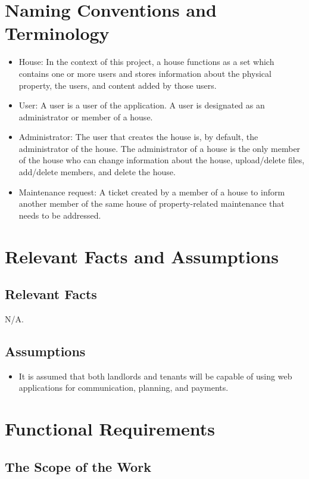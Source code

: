 \documentclass[12pt]{article}
\begin{document}
\section{Naming Conventions and Terminology}
    \begin{itemize}
    \item House: In the context of this project, a house functions as a set
      which contains one or more users and stores information about the
      physical property, the users, and content added by those users.
    \item User: A user is a user of the application. A user is designated as an administrator or member of a house.
    \item Administrator: The user that creates the house is, by default, the administrator of the house. The administrator of a house is the only member of the house who can change information about the house, upload/delete files, add/delete members, and delete the house.
    \item Maintenance request: A ticket created by a member of a house to inform another member of the same house of property-related maintenance that needs to be addressed.
    \end{itemize}

\section{Relevant Facts and Assumptions} 
\subsection{Relevant Facts}
N/A.
\subsection{Assumptions}
  \begin{itemize}
  \item  It is assumed that both landlords and tenants will be capable of using
    web applications for communication, planning, and payments.
  \end{itemize} 

\section{Functional Requirements} 
\subsection{The Scope of the Work}
\end{document}
